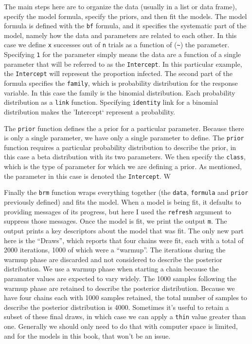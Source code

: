 \documentclass[
]{book}
\begin{document}
The main steps here are to organize the data (usually in a list or data frame), specify the model formula, specify the priors, and then fit the models. The model formula is defined with the \texttt{bf} formula, and it specifies the systematic part of the model, namely how the data and parameters are related to each other. In this case we define \texttt{x} successes out of \texttt{n} trials as a function of (\texttt{\textasciitilde{}}) the parameter. Specifying \texttt{1} for the parameter simply means the data are a function of a single parameter that will be referred to as the \texttt{Intercept}. In this particular example, the \texttt{Intercept} will represent the proportion infected. The second part of the formula specifies the \texttt{family}, which is probability distribution for the response variable. In this case the family is the binomial distribution. Each probability distribution as a \texttt{link} function. Specifying \texttt{identity} link for a binomial distribution makes the 'Intercept` represent a probability.

The \texttt{prior} function defines the a prior for a particular parameter. Because there is only a single parameter, we have only a single parameter to define. The \texttt{prior} function requires a particular probability distribution to describe the prior, in this case a beta distribution with its two parameters. We then specify the \texttt{class}, which is the type of parameter for which we are defining a prior. As mentioned, the parameter in this case is denoted the \texttt{Intercept}. W

Finally the \texttt{brm} function wraps everything together (the \texttt{data}, \texttt{formula} and \texttt{prior} previously defined) and fits the model. When a model is being fit, it defaults to providing messages of its progress, but here I used the \texttt{refresh} argument to suppress those messages. Once the model is fit, we print the output \texttt{m}. The output prints a key descriptors about the model that was fit. The only new part here is the ``Draws'', which reports that four chains were fit, each with a total of 2000 iterations, 1000 of which were a ``warmup''. The iterations during the warmup phase are discarded and not considered to describe the posterior distribution. We use a warmup phase when starting a chain because the paramater values are expected to vary widely. The 1000 samples following the warmup phase are retained to describe the posterior distribution. Because we have four chains each with 1000 samples retained, the total number of samples to describe the posterior distribution is 4000. Sometimes it's useful to retain a subset of these final draws, in which case we can apply a \texttt{thin} value greater than one. Generally we should only need to do that with computer space is limited, and for the models in this book, that won't be an issue.
\end{document}
